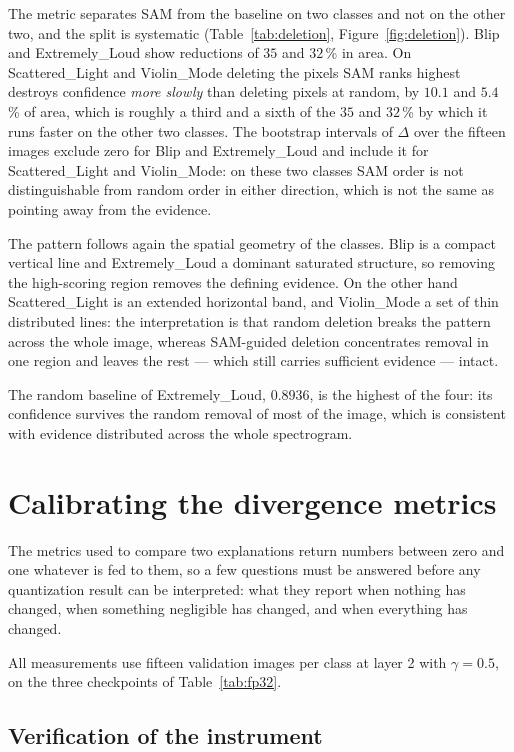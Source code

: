 The metric separates SAM from the baseline on two classes and not on the other
two, and the split is systematic (Table~\ref{tab:deletion},
Figure~\ref{fig:deletion}). Blip and Extremely\_Loud show reductions of $35$ and
$32$\,\% in area. On Scattered\_Light and Violin\_Mode deleting the
pixels SAM ranks highest destroys confidence \emph{more slowly} than deleting
pixels at random, by $10.1$ and $5.4$\,\% of area, which is roughly a third and a
sixth of the $35$ and $32$\,\% by which it runs faster on the other two classes.
The bootstrap intervals of $\Delta$ over the fifteen images exclude zero for
Blip and Extremely\_Loud and include it for Scattered\_Light and Violin\_Mode:
on these two classes SAM order is not distinguishable from random order in
either direction, which is not the same as pointing away from the evidence.

The pattern follows again the spatial geometry of the classes. 
Blip is a compact vertical line and Extremely\_Loud a dominant saturated
structure, so removing the high-scoring region removes the defining evidence.
On the other hand
Scattered\_Light is an extended horizontal band, and Violin\_Mode a set of thin
distributed lines: the interpretation is that random deletion breaks 
the pattern across the whole image,
whereas SAM-guided deletion concentrates removal in one region and leaves the
rest --- which still carries sufficient evidence --- intact.

The random baseline of Extremely\_Loud, $0.8936$, is the highest of the four: its
confidence survives the random removal of most of the image, which is consistent
with evidence distributed across the whole spectrogram.

\section{Calibrating the divergence metrics}
\label{sec:calibration}

The metrics used to compare two explanations return numbers between zero and one
whatever is fed to them, so a few questions must be answered before any
quantization result can be interpreted: what they report when nothing has changed, when
something negligible has changed, and when everything has changed.

All measurements use fifteen validation images per class at layer 2 with
$\gamma = 0.5$, on the three checkpoints of Table~\ref{tab:fp32}.

\subsection{Verification of the instrument}

